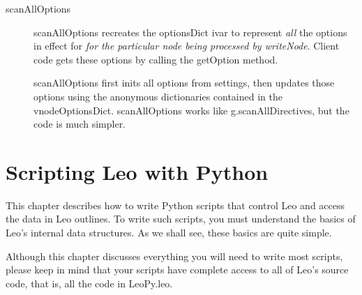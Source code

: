 \documentclass[a4paper,10pt,english]{sphinxmanual}
\begin{document}
\begin{description}
\item[{scanAllOptions}] \leavevmode
scanAllOptions recreates the optionsDict ivar to represent \emph{all} the options
in effect for \emph{for the particular node being processed by writeNode}. Client
code gets these options by calling the getOption method.

scanAllOptions first inits all options from settings,
then updates those options using the anonymous
dictionaries contained in the vnodeOptionsDict.
scanAllOptions works like g.scanAllDirectives, but the code is much simpler.

\end{description}


\chapter{Scripting Leo with Python}
\label{scripting::doc}\label{scripting:scripting-leo-with-python}
This chapter describes how to write Python scripts that control Leo and
access the data in Leo outlines. To write such scripts, you must understand
the basics of Leo's internal data structures. As we shall see, these basics
are quite simple.

Although this chapter discusses everything you will need to write most
scripts, please keep in mind that your scripts have complete access to all
of Leo's source code, that is, all the code in LeoPy.leo.
\end{document}
